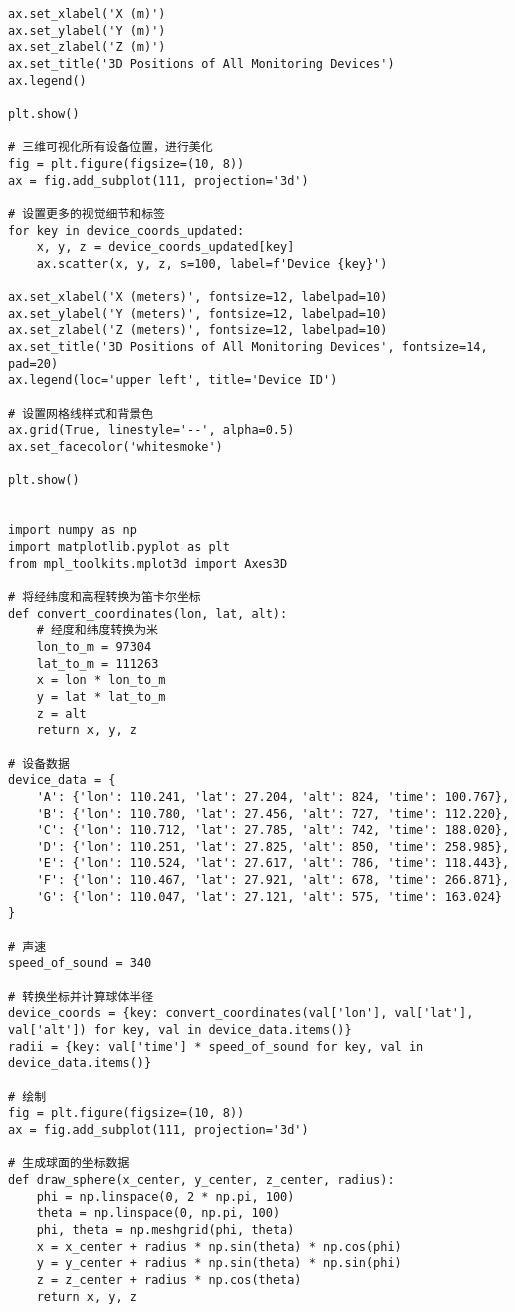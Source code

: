 \documentclass[withoutpreface,bwprint,12pt,a4paper]{cumcmthesis}
\begin{document}
\begin{appendices}
\begin{lstlisting}
ax.set_xlabel('X (m)')
ax.set_ylabel('Y (m)')
ax.set_zlabel('Z (m)')
ax.set_title('3D Positions of All Monitoring Devices')
ax.legend()

plt.show()

# 三维可视化所有设备位置，进行美化
fig = plt.figure(figsize=(10, 8))
ax = fig.add_subplot(111, projection='3d')

# 设置更多的视觉细节和标签
for key in device_coords_updated:
    x, y, z = device_coords_updated[key]
    ax.scatter(x, y, z, s=100, label=f'Device {key}')

ax.set_xlabel('X (meters)', fontsize=12, labelpad=10)
ax.set_ylabel('Y (meters)', fontsize=12, labelpad=10)
ax.set_zlabel('Z (meters)', fontsize=12, labelpad=10)
ax.set_title('3D Positions of All Monitoring Devices', fontsize=14, pad=20)
ax.legend(loc='upper left', title='Device ID')

# 设置网格线样式和背景色
ax.grid(True, linestyle='--', alpha=0.5)
ax.set_facecolor('whitesmoke')

plt.show()


import numpy as np
import matplotlib.pyplot as plt
from mpl_toolkits.mplot3d import Axes3D

# 将经纬度和高程转换为笛卡尔坐标
def convert_coordinates(lon, lat, alt):
    # 经度和纬度转换为米
    lon_to_m = 97304
    lat_to_m = 111263
    x = lon * lon_to_m
    y = lat * lat_to_m
    z = alt
    return x, y, z

# 设备数据
device_data = {
    'A': {'lon': 110.241, 'lat': 27.204, 'alt': 824, 'time': 100.767},
    'B': {'lon': 110.780, 'lat': 27.456, 'alt': 727, 'time': 112.220},
    'C': {'lon': 110.712, 'lat': 27.785, 'alt': 742, 'time': 188.020},
    'D': {'lon': 110.251, 'lat': 27.825, 'alt': 850, 'time': 258.985},
    'E': {'lon': 110.524, 'lat': 27.617, 'alt': 786, 'time': 118.443},
    'F': {'lon': 110.467, 'lat': 27.921, 'alt': 678, 'time': 266.871},
    'G': {'lon': 110.047, 'lat': 27.121, 'alt': 575, 'time': 163.024}
}

# 声速
speed_of_sound = 340

# 转换坐标并计算球体半径
device_coords = {key: convert_coordinates(val['lon'], val['lat'], val['alt']) for key, val in device_data.items()}
radii = {key: val['time'] * speed_of_sound for key, val in device_data.items()}

# 绘制
fig = plt.figure(figsize=(10, 8))
ax = fig.add_subplot(111, projection='3d')

# 生成球面的坐标数据
def draw_sphere(x_center, y_center, z_center, radius):
    phi = np.linspace(0, 2 * np.pi, 100)
    theta = np.linspace(0, np.pi, 100)
    phi, theta = np.meshgrid(phi, theta)
    x = x_center + radius * np.sin(theta) * np.cos(phi)
    y = y_center + radius * np.sin(theta) * np.sin(phi)
    z = z_center + radius * np.cos(theta)
    return x, y, z


\end{lstlisting}
\end{appendices}
\end{document}
